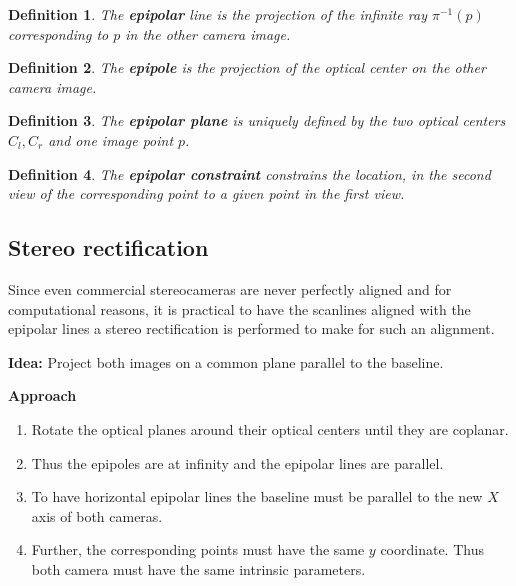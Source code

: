 \documentclass[10pt,a4paper]{scrartcl}
\newtheorem{define}{Definition}
\begin{document}
\begin{multicols*}{2}
\begin{define}
The \textbf{epipolar} line is the projection of the infinite ray $\pi^{-1}(p)$ corresponding to $p$ in the other camera image.
\end{define}

\begin{define}
The \textbf{epipole} is the projection of the optical center on the other camera image.
\end{define}


\begin{define}
The \textbf{epipolar plane} is uniquely defined by the two optical centers $C_l,C_r$ and one image point $p$.
\end{define}

\begin{define}
The \textbf{epipolar constraint} constrains the location, in the second view of the corresponding point to a given point in the first view.
\end{define}


\subsection{Stereo rectification}

Since even commercial stereocameras are never perfectly aligned and for computational reasons, it is practical to have the scanlines aligned with the epipolar lines a stereo rectification is performed to make for such an alignment.

\vspace{3ex}

\textbf{Idea:} Project both images on a common plane parallel to the baseline.

\vspace{3ex}

\textbf{Approach}

\begin{enumerate}
\item Rotate the optical planes around their optical centers until they are coplanar.
\item Thus the epipoles are at infinity and the epipolar lines are parallel.
\item To have horizontal epipolar lines the baseline must be parallel to the new $X$ axis of both cameras.
\item Further, the corresponding points must have the same $y$ coordinate. Thus both camera must have the same intrinsic parameters.
\end{enumerate}


\end{multicols*}
\end{document}
